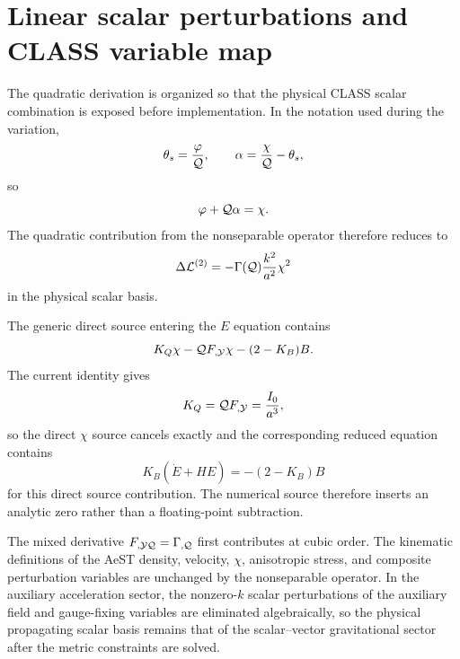 \section{Linear scalar perturbations and CLASS variable map}\label{app:linear}
The quadratic derivation is organized so that the physical CLASS scalar combination is exposed before implementation. In the notation used during the variation,
\begin{equation}
\theta_s=\frac{\varphi}{\mathcal{Q}},\qquad
\alpha=\frac{\chi}{\mathcal{Q}}-\theta_s,
\end{equation}
so
\begin{equation}
\varphi+\mathcal{Q}\alpha=\chi.
\end{equation}
The quadratic contribution from the nonseparable operator therefore reduces to
\begin{equation}
\Delta\mathcal L^{(2)}=-\Gamma(\mathcal{Q})\frac{k^2}{a^2}\chi^2
\end{equation}
in the physical scalar basis.

The generic direct source entering the $E$ equation contains
\begin{equation}
K_Q\chi-\mathcal{Q} F_{,\mathcal{Y}}\chi-(2-K_B)B.
\end{equation}
The current identity gives
\begin{equation}
K_Q=\mathcal{Q} F_{,\mathcal{Y}}=\frac{I_0}{a^3},
\end{equation}
so the direct $\chi$ source cancels exactly and the corresponding reduced equation contains
\begin{equation}
K_B(\dot E+HE)=-(2-K_B)B
\end{equation}
for this direct source contribution. The numerical source therefore inserts an analytic zero rather than a floating-point subtraction.

The mixed derivative $F_{,\mathcal{Y}\mathcal{Q}}=\Gamma_{,\mathcal{Q}}$ first contributes at cubic order. The kinematic definitions of the AeST density, velocity, $\chi$, anisotropic stress, and composite perturbation variables are unchanged by the nonseparable operator. In the auxiliary acceleration sector, the nonzero-$k$ scalar perturbations of the auxiliary field and gauge-fixing variables are eliminated algebraically, so the physical propagating scalar basis remains that of the scalar--vector gravitational sector after the metric constraints are solved.
